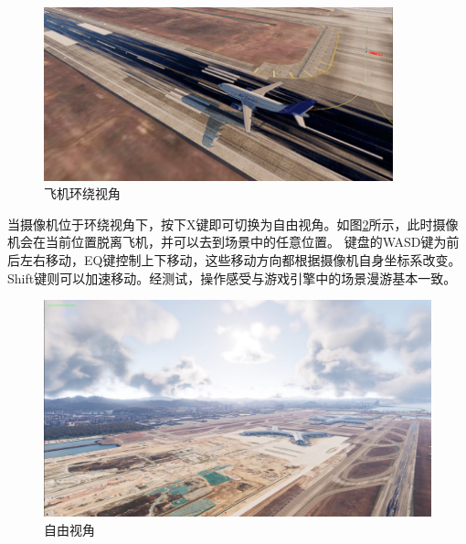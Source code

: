 \begin{figure}[h!]
    \begin{center}
        \includegraphics[width=0.9\textwidth]{pictures/orbitcamera.png}
        \caption{飞机环绕视角}
        \label{orbittest}
    \end{center}
\end{figure}
\par
当摄像机位于环绕视角下，按下X键即可切换为自由视角。如图\ref{freetest}所示，此时摄像机会在当前位置脱离飞机，并可以去到场景中的任意位置。
键盘的WASD键为前后左右移动，EQ键控制上下移动，这些移动方向都根据摄像机自身坐标系改变。Shift键则可以加速移动。经测试，操作感受与游戏引擎中的场景漫游基本一致。
\begin{figure}[h!]
    \begin{center}
        \includegraphics[width=.85\textwidth]{pictures/freecamera.png}
        \caption{自由视角}
        \label{freetest}
    \end{center}
\end{figure}


